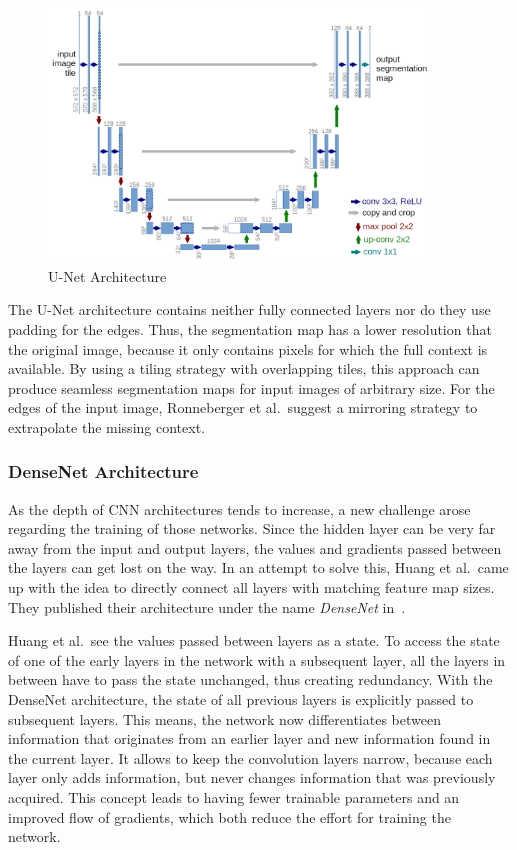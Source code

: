 \begin{figure}[h]
    \centering
    \includegraphics[width=0.9\textwidth]{images/u-net-architecture}
    \caption{U-Net Architecture \cite{unet15}}
    \label{fig:unet_architecture}
\end{figure}

The U-Net architecture contains neither fully connected layers nor do they use padding for the edges. Thus, the segmentation map has a lower resolution that the original image, because it only contains pixels for which the full context is available. By using a tiling strategy with overlapping tiles, this approach can produce seamless segmentation maps for input images of arbitrary size. For the edges of the input image, Ronneberger et al.\ suggest a mirroring strategy to extrapolate the missing context.~\cite{unet15}


\subsubsection{DenseNet Architecture}
As the depth of CNN architectures tends to increase, a new challenge arose regarding the training of those networks. Since the hidden layer can be very far away from the input and output layers, the values and gradients passed between the layers can get lost on the way. In an attempt to solve this, Huang et al.\ came up with the idea to directly connect all layers with matching feature map sizes. They published their architecture under the name \emph{DenseNet} in~\cite{densenet18}.

Huang et al.\ see the values passed between layers as a state. To access the state of one of the early layers in the network with a subsequent layer, all the layers in between have to pass the state unchanged, thus creating redundancy. With the DenseNet architecture, the state of all previous layers is explicitly passed to subsequent layers. This means, the network now differentiates between information that originates from an earlier layer and new information found in the current layer. It allows to keep the convolution layers narrow, because each layer only adds information, but never changes information that was previously acquired. This concept leads to having fewer trainable parameters and an improved flow of gradients, which both reduce the effort for training the network.~\cite{densenet18}

